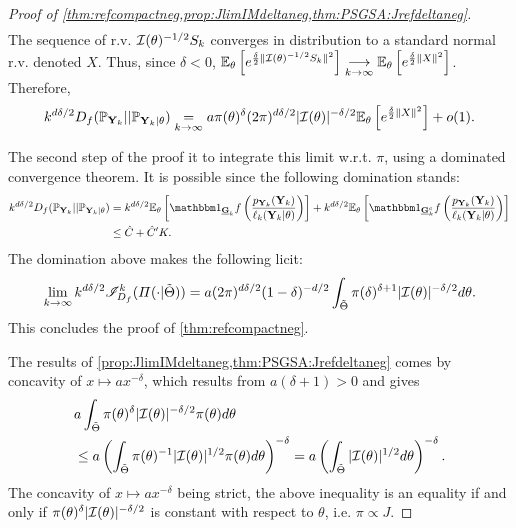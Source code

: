 \begin{proof}[Proof of \cref{thm:refcompactneg,prop:JlimIMdeltaneg,thm:PSGSA:Jrefdeltaneg}]
\begin{align}
\end{align}
The sequence of r.v. $\mathcal{I}(\theta)^{-1/2}S_k$ converges in distribution to a standard normal r.v. denoted $X$.
Thus, since $\delta<0$, $\mathbb{E}_\theta\left[e^{\frac{\delta}{2} \|\mathcal{I}(\theta)^{-1/2}S_k\|^2}\right]\overset{\ }{\underset{k\rightarrow\infty}{\longrightarrow}}\mathbb{E}_\theta\left[e^{\frac{\delta}{2} \|X\|^2}\right]$. %
Therefore, 
\begin{align}
    k^{d\delta/2} D_f(\mathbb{P}_{\mathbf{Y}_k} || \mathbb{P}_{\mathbf{Y}_k|\theta}) \overset{}{\underset{k\rightarrow\infty}{=}} a\pi(\theta)^\delta(2\pi)^{d\delta/2}|\mathcal{I}(\theta)|^{-\delta/2}\mathbb{E}_\theta\left[e^{\frac{\delta}{2} \|X\|^2}\right] + o(1).  
\end{align}

The second step of the proof it to integrate this limit w.r.t. $\pi$, using a dominated convergence theorem.
It is possible since the following domination stands:
\begin{equation}
    \begin{aligned}
    k^{d\delta/2}D_f(\PP_{\mbf Y_k}||\PP_{\mbf Y_k|\theta}) 
            &=  k^{d\delta/2} \EE_{\theta}\left[\indic_{\ubf G_k}f\left(\frac{p_{\mbf Y_k}(\mbf Y_k)}{\ell_k(\mbf Y_k|\theta)}\right) \right] + 
            k^{d\delta/2} \EE_{\theta}\left[ \indic_{\ubf G_k^c}f\left(\frac{p_{\mbf Y_k}(\mbf Y_k)}{\ell_k(\mbf Y_k|\theta)}\right) \right] \\
         &\leq \hat C  + \hat C'K. %
    \end{aligned}
\end{equation}
The domination above makes the following licit:
    \begin{equation}
        \lim_{k\rightarrow\infty} k^{d\delta/2}\mathscr{I}^k_{D_f}(\varPi(\cdot|\tilde\Theta))  = a(2\pi)^{d\delta/2}(1-\delta)^{-d/2} \int_{\tilde\Theta}\pi(\delta)^{\delta+1}|\mathcal{I}(\theta)|^{-\delta/2}d\theta.
    \end{equation}
This concludes the proof of \cref{thm:refcompactneg}. 

The results of \cref{prop:JlimIMdeltaneg,thm:PSGSA:Jrefdeltaneg} comes by 
concavity of $x\mapsto a x^{-\delta}$, which results from $a(\delta+1)>0$ and  gives
    \begin{align}
    \nonumber
        &a \int_{\tilde\Theta}\pi(\theta)^\delta |\cI(\theta)|^{-\delta/2}\pi(\theta)d\theta \\
            &\leq a\left(\int_{\tilde\Theta}\pi(\theta)^{-1}|\cI(\theta)|^{1/2}\pi(\theta)d\theta\right)^{-\delta}
            = a \left(\int_{\tilde\Theta} |\cI(\theta)|^{1/2} d\theta\right)^{-\delta}. %
    \end{align}
The concavity of $x\mapsto a x^{-\delta}$ being strict, the above inequality is an equality if and only if 
$\pi(\theta)^\delta|\mathcal{I}(\theta)|^{-\delta/2}$ is constant with respect to  $\theta$, i.e. $\pi\propto J$.



\end{proof}



